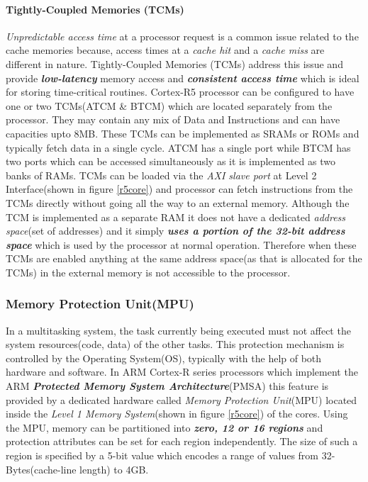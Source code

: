 \documentclass[a4paper,11pt]{article}
\begin{document}
\paragraph{Tightly-Coupled Memories (TCMs)}  \textit{Unpredictable access time} at a processor request is a common issue related to the cache memories because, access times at a \textit{cache hit} and a \textit{cache miss} are different in nature. Tightly-Coupled Memories (TCMs) address this issue and provide \textbf{\textit{low-latency}} memory access and \textbf{\textit{consistent access time}} which is ideal for storing time-critical routines\cite{crspg}. Cortex-R5 processor can be configured to have one or two TCMs(ATCM \& BTCM) which are located separately from the processor. They may contain any mix of Data and Instructions and can have capacities upto 8MB. These TCMs can be implemented as SRAMs or ROMs and typically fetch data in a single cycle. ATCM has a single port while BTCM has two ports which can be accessed simultaneously as it is implemented as two banks of RAMs. TCMs can be loaded via the \textit{AXI slave port} at Level 2 Interface(shown in figure \ref{r5core}) and processor can fetch instructions from the TCMs directly without going all the way to an external memory. Although the TCM is implemented as a separate RAM it does not have a dedicated \textit{address space}(set of addresses) and it simply \textbf{\textit{uses a portion of the 32-bit address space}} which is used by the processor at normal operation. Therefore when these TCMs are enabled anything at the same address space(as that is allocated for the TCMs) in the external memory is not accessible to the processor\cite{crtrm}.


\subsubsection{Memory Protection Unit(MPU)}

In a multitasking system, the task currently being executed must not affect the system resources(code, data) of the other tasks. This protection mechanism is controlled by the Operating System(OS), typically with the help of both hardware and software. In ARM Cortex-R series processors which implement the ARM \textit{\textbf{Protected Memory System Architecture}}(PMSA) this feature is provided by a dedicated hardware called \textit{Memory Protection Unit}(MPU)\cite{crspg} located inside the \textit{Level 1 Memory System}(shown in figure \ref{r5core}) of the cores. Using the MPU,  memory can be partitioned into \textbf{\textit{zero, 12 or 16 regions}} and protection attributes can be set for each region independently. The size of such a region is specified by a 5-bit value which encodes a range of values from 32-Bytes(cache-line length) to 4GB.\cite{crtrm}
\end{document}
